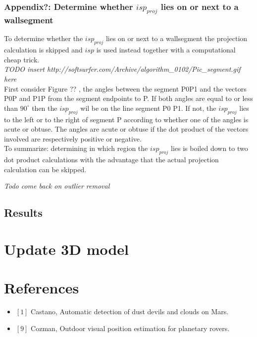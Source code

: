 \documentclass[10pt]{article}
\begin{document}
\subsubsection{Appendix?: Determine whether $isp_{proj}$ lies on or next to a wallsegment}



To determine whether the $isp_{proj}$ lies on or next to a wallsegment the
projection calculation is skipped and $isp$ is used instead together with a
computational cheap trick.\\


\textit{ TODO insert http://softsurfer.com/Archive/algorithm\_0102/Pic\_segment.gif here}\\
First consider Figure ?? , the angles between the segment P0P1 and the vectors P0P and P1P
from the segment endpoints to P. If both angles are equal to or less than
$90^{\circ}$ then the $isp_{proj}$ wil be on the line segment P0 P1.  If not,
the $isp_{proj}$ lies to the left or to the right of segment P according to
whether one of the angles is acute or obtuse.  The angles are acute or obtuse
if the dot product of the vectors involved are respectively positive or
	negative.\\
To summarize: determining in which region the $isp_{proj}$ lies is boiled down to
two dot product calculations with the advantage that the actual projection
calculation can be skipped.


\textit{Todo come back on outlier removal}
\subsection{Results}

\section{Update 3D model}


\section{References}
\begin{itemize}
\item $[1]$ Castano, Automatic detection of dust devils and clouds on Mars.
\item $[9]$ Cozman, Outdoor visual position estimation for planetary rovers.
\end{itemize}
\end{document}
